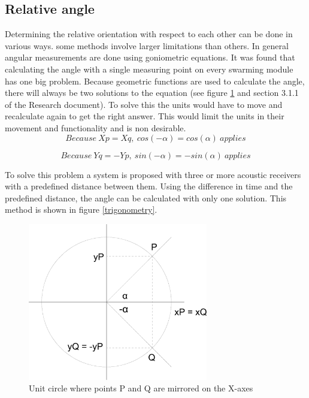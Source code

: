 \documentclass[10pt,a4paper]{article}
\begin{document}
\subsection{Relative angle}
Determining the relative orientation with respect to each other can be done in various ways. some methods involve larger limitations than others. In general angular measurements are done using goniometric equations. It was found that calculating the angle with a single measuring point on every swarming module has one big problem. Because geometric functions are used to calculate the angle, there will always be two solutions to the equation (see figure \ref{circle} and section 3.1.1 of the Research document). To solve this the units would have to move and recalculate again to get the right answer. This would limit the units in their movement and functionality and is non desirable.
\begin{equation}
Because\ Xp = Xq,\ cos(-\alpha) = cos(\alpha)\ applies
\end{equation}

\begin{equation}
Because\ Yq = -Yp,\ sin(-\alpha) = -sin(\alpha)\ applies
\end{equation}


To solve this problem a system is proposed with three or more acoustic receivers with a predefined distance between them. Using the difference in time and the predefined distance, the angle can be calculated with only one solution. This method is shown in figure \ref{trigonometry}.

\begin{figure}[H]
\centering
\includegraphics[width=0.7\textwidth]{Cirkel.pdf}
\caption{Unit circle where points P and Q are mirrored on the X-axes}
\label{circle}
\end{figure}
\end{document}

